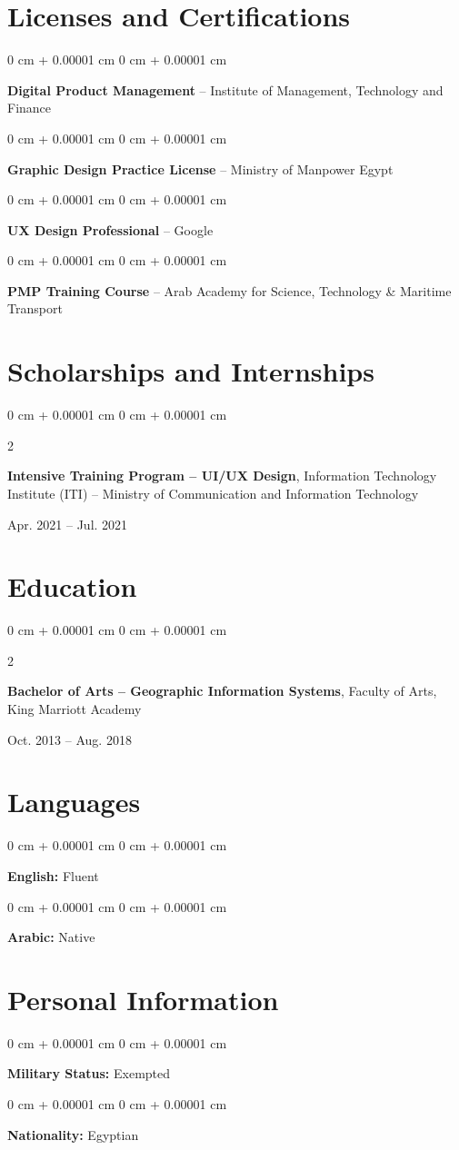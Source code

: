 \documentclass[10pt, letterpaper]{article}
\newenvironment{onecolentry}{
    \begin{adjustwidth}{
        0 cm + 0.00001 cm
    }{
        0 cm + 0.00001 cm
    }
}{
    \end{adjustwidth}
} %
\newenvironment{twocolentry}[2][]{
    \onecolentry
    \def\secondColumn{#2}
    \setcolumnwidth{\fill, 4.5 cm}
    \begin{paracol}{2}
}{
    \switchcolumn \raggedleft \secondColumn
    \end{paracol}
    \endonecolentry
} %
\begin{document}
\section{Licenses and Certifications}

\begin{onecolentry}
    \textbf{Digital Product Management} -- Institute of Management, Technology and Finance
\end{onecolentry}

\begin{onecolentry}
    \textbf{Graphic Design Practice License} -- Ministry of Manpower Egypt
\end{onecolentry}

\begin{onecolentry}
    \textbf{UX Design Professional} -- Google
\end{onecolentry}

\begin{onecolentry}
    \textbf{PMP Training Course} -- Arab Academy for Science, Technology \& Maritime Transport
\end{onecolentry}

\vspace{0.28cm}
\section{Scholarships and Internships}
\begin{twocolentry}{Apr. 2021 -- Jul. 2021}
    \textbf{Intensive Training Program -- UI/UX Design}, Information Technology Institute (ITI) -- Ministry of Communication and Information Technology
\end{twocolentry}

\vspace{0.28cm}
\section{Education}
\begin{twocolentry}{Oct. 2013 -- Aug. 2018}
    \textbf{Bachelor of Arts -- Geographic Information Systems}, Faculty of Arts, King Marriott Academy
\end{twocolentry}

\vspace{0.28cm}
\section{Languages}

\begin{onecolentry}
    \textbf{English:} Fluent
\end{onecolentry}

\begin{onecolentry}
    \textbf{Arabic:} Native
\end{onecolentry}

\vspace{0.28cm}
\section{Personal Information}

\begin{onecolentry}
    \textbf{Military Status:} Exempted
\end{onecolentry}

\begin{onecolentry}
    \textbf{Nationality:} Egyptian
\end{onecolentry}
\end{document}
